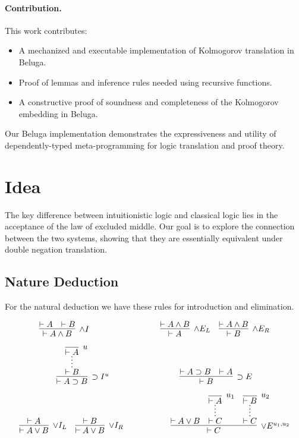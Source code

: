 \documentclass{article}
\begin{document}
\paragraph{Contribution.} This work contributes:
\begin{itemize}
    \item A mechanized and executable implementation of Kolmogorov translation in Beluga.
    \item Proof of lemmas and inference rules needed using recursive functions.
    \item A constructive proof of soundness and completeness of the Kolmogorov embedding in Beluga.
\end{itemize}
Our Beluga implementation demonstrates the expressiveness and utility of dependently-typed meta-programming for logic translation and proof theory.


\section{Idea}

The key difference between intuitionistic logic and classical logic lies in the acceptance of the law of excluded middle. Our goal is to explore the connection between the two systems, showing that they are essentially equivalent under double negation translation.


\subsection{Nature Deduction}
For the natural deduction we have these rules for
 introduction and elimination.

\[
\infer[\land I]{\vdash A \land B}{\vdash A & \vdash B}
\hspace{3cm}
\infer[\land E_L]{\vdash A}{\vdash A \land B}
\quad
\infer[\land E_R]{\vdash B}{\vdash A \land B}
\]


\[
\infer[\supset I^u]{\vdash A \supset B}{
  \infer*{\vdash B}{\infer [u]{\vdash A}{}}
}
\hspace{3cm}
\infer[\supset E]{\vdash B}{\vdash A \supset B & \vdash A}
\]



\[
\infer[\lor I_L]{\vdash A \lor B}{\vdash A}
\quad
\infer[\lor I_R]{\vdash A \lor B}{\vdash B}
\hspace{2cm}
\infer[\lor E^{u_1, u_2}]{\vdash C}{
  \vdash A \lor B
  \quad
  \infer*{\vdash C}{\infer[u_1]{\vdash A}{}}
  \quad
  \infer*{\vdash C}{\infer[u_2]{\vdash B}{}}
}
\]
\end{document}
